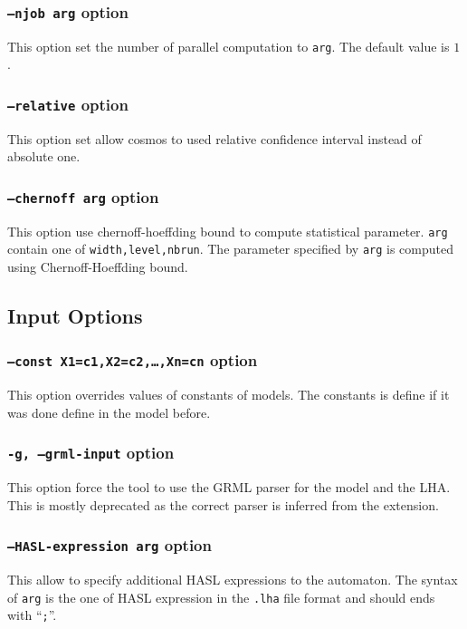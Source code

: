 \documentclass{article}
\begin{document}
\subsubsection{\texttt{--njob arg}  option}
This option set the number of parallel computation to \texttt{arg}.
The default value is $1$.

\subsubsection{\texttt{--relative}  option}
This option set allow cosmos to used relative confidence interval
instead of absolute one.

\subsubsection{\texttt{--chernoff arg}  option}
This option use chernoff-hoeffding bound to compute statistical parameter.
\texttt{arg} contain one of \texttt{width,level,nbrun}. The parameter 
specified by \texttt{arg} is computed using Chernoff-Hoeffding bound.

\subsection{Input Options}

\subsubsection{\texttt{--const X1=c1,X2=c2,\dots,Xn=cn}  option}
This option overrides values of constants of models. The constants is
define if it was done define in the model before.

\subsubsection{\texttt{-g, --grml-input}  option}
This option force the tool to use the GRML parser for the model and
the LHA. This is mostly deprecated as the correct parser is inferred
from the extension.

\subsubsection{\texttt{--HASL-expression arg}  option}
This allow to specify additional HASL{} expressions to the automaton.
The syntax of \texttt{arg} is the one of HASL{} expression in the
\texttt{.lha} file format and should ends with ``\texttt{;}''.
\end{document}
